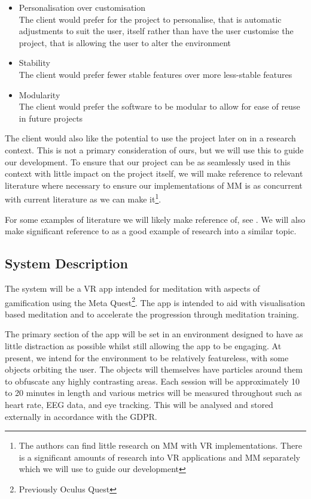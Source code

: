\documentclass[coverpage,lineno]{../custom}
\begin{document}
\begin{itemize}
	\item Personalisation over customisation\\
	The client would prefer for the project to personalise, that is automatic adjustments to suit the user, itself rather than have the user customise the project, that is allowing the user to alter the environment
	\item Stability\\
	The client would prefer fewer stable features over more less-stable features
	\item Modularity\\
	The client would prefer the software to be modular to allow for ease of reuse in future projects
\end{itemize}

The client would also like the potential to use the project later on in a research context. This is not a primary consideration of ours, but we will use this to guide our development. To ensure that our project can be as seamlessly used in this context with little impact on the project itself, we will make reference to relevant literature where necessary to ensure our implementations of MM is as concurrent with current literature as we can make it\footnote{The authors can find little research on MM with VR implementations. There is a significant amounts of research into VR applications and MM separately which we will use to guide our development}.

For some examples of literature we will likely make reference of, see \cite{kosunen_relaworld_2016, tang_neuroscience_2015, wang_reducing_2022}. We will also make significant reference to \cite{lan_slow_2021} as a good example of research into a similar topic.

\subsection{System Description}
\label{ssec:desc}

The system will be a VR app intended for meditation with aspects of gamification\cite{toda_taxonomy_2019} using the Meta Quest\footnote{Previously Oculus Quest}. The app is intended to aid with visualisation based meditation and to accelerate the progression through meditation training.

The primary section of the app will be set in an environment designed to have as little distraction as possible whilst still allowing the app to be engaging. At present, we intend for the environment to be relatively featureless, with some objects orbiting the user. The objects will themselves have particles around them to obfuscate any highly contrasting areas. Each session will be approximately 10 to 20 minutes in length and various metrics will be measured throughout such as heart rate, EEG data, and eye tracking. This will be analysed and stored externally in accordance with the GDPR.
\end{document}
